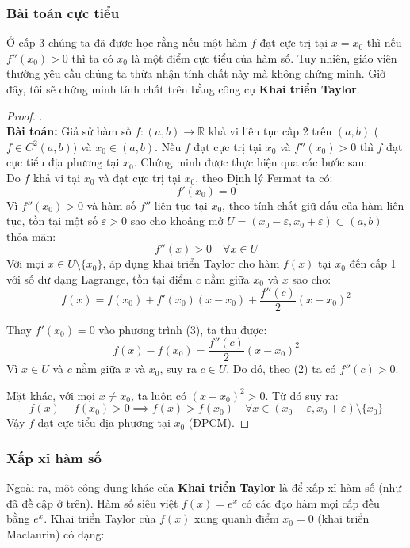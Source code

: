 \documentclass[12pt]{article}
\theoremstyle{definition}
\theoremstyle{remark}
\begin{document}
\subsubsection{Bài toán cực tiểu}
Ở cấp 3 chúng ta đã được học rằng nếu một hàm $f$ đạt cực trị tại $x=x_0$ thì nếu $f''(x_0)>0$ thì ta có $x_0$ là một điểm cực tiểu của hàm số. Tuy nhiên, giáo viên thường yêu cầu chúng ta thừa nhận tính chất này mà không chứng minh. Giờ đây, tôi sẽ chứng minh tính chất trên bằng công cụ \textbf{Khai triển Taylor}.
\begin{proof}.\\
    \textbf{Bài toán:}
Giả sử hàm số $f: (a, b) \to \mathbb{R}$ khả vi liên tục cấp 2 trên $(a, b)$ ($f \in C^2(a, b)$) và $x_0 \in (a, b)$. Nếu $f$ đạt cực trị tại $x_0$ và $f''(x_0) > 0$ thì $f$ đạt cực tiểu địa phương tại $x_0$.
Chứng minh được thực hiện qua các bước sau:\\
Do $f$ khả vi tại $x_0$ và đạt cực trị tại $x_0$, theo Định lý Fermat ta có:
\begin{equation}
    f'(x_0) = 0
\end{equation}
Vì $f''(x_0) > 0$ và hàm số $f''$ liên tục tại $x_0$, theo tính chất giữ dấu của hàm liên tục, tồn tại một số $\varepsilon > 0$ sao cho khoảng mở $U = (x_0 - \varepsilon, x_0 + \varepsilon) \subset (a, b)$ thỏa mãn:
\begin{equation}
    f''(x) > 0 \quad \forall x \in U
\end{equation}
Với mọi $x \in U \setminus \{x_0\}$, áp dụng khai triển Taylor cho hàm $f(x)$ tại $x_0$ đến cấp 1 với số dư dạng Lagrange, tồn tại điểm $c$ nằm giữa $x_0$ và $x$ sao cho:
\begin{equation}
    f(x) = f(x_0) + f'(x_0)(x - x_0) + \frac{f''(c)}{2}(x - x_0)^2
\end{equation}

Thay $f'(x_0) = 0$ vào phương trình (3), ta thu được:
\[
f(x) - f(x_0) = \frac{f''(c)}{2}(x - x_0)^2
\]
Vì $x \in U$ và $c$ nằm giữa $x$ và $x_0$, suy ra $c \in U$. Do đó, theo (2) ta có $f''(c) > 0$. 

Mặt khác, với mọi $x \neq x_0$, ta luôn có $(x - x_0)^2 > 0$. Từ đó suy ra:
\[
f(x) - f(x_0) > 0 \implies f(x) > f(x_0) \quad \forall x \in (x_0 - \varepsilon, x_0 + \varepsilon) \setminus \{x_0\}
\]
Vậy $f$ đạt cực tiểu địa phương tại $x_0$ (ĐPCM).
\end{proof}
\subsubsection{Xấp xỉ hàm số}
Ngoài ra, một công dụng khác của \textbf{Khai triển Taylor} là để xấp xỉ hàm số (như đã đề cập ở trên).
Hàm số siêu việt $f(x) = e^x$ có các đạo hàm mọi cấp đều bằng $e^x$. Khai triển Taylor của $f(x)$ xung quanh điểm $x_0 = 0$ (khai triển Maclaurin) có dạng:
\end{document}
